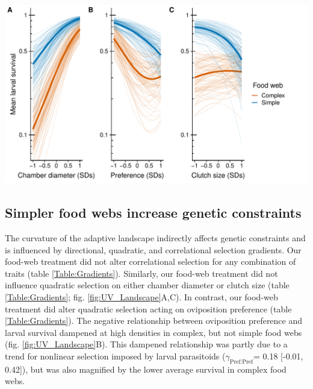 \documentclass[11pt,]{article}
\let\origfigure\figure
\let\endorigfigure\endfigure
\renewenvironment{figure}[1][2] {
    \expandafter\origfigure\expandafter[H]
} {
    \endorigfigure
}
\begin{document}
\begin{figure}
\centering
\includegraphics{analyses/UV_landscapes.pdf}
\caption{\label{fig:UV_Landscape}Adaptive landscape of gall midge
phenotypes in complex vs.~simple food webs. Each panel corresponds to a
different phenotypic trait: chamber diameter (A); oviposition preference
(B); and clutch size (C). Bold lines represent selection experienced in
complex (orange) and simple (blue) food webs. Thin lines represent
bootstrapped replicates to show the uncertainty in selection. For
clarity, we only display 100 bootstraps even though inferences are based
on 1,000 replicates. Note that mean larval survival is plotted on a
natural log scale to reflect the mathematical defintion of the adaptive
landscape.}
\end{figure}

\subsection{Simpler food webs increase genetic
constraints}\label{simpler-food-webs-increase-genetic-constraints}

\indent The curvature of the adaptive landscape indirectly affects
genetic constraints and is influenced by directional, quadratic, and
correlational selection gradients. Our food-web treatment did not alter
correlational selection for any combination of traits (table
\ref{Table:Gradients}). Similarly, our food-web treatment did not
influence quadratic selection on either chamber diameter or clutch size
(table \ref{Table:Gradients}; fig. \ref{fig:UV_Landscape}A,C). In
contrast, our food-web treatment did alter quadratic selection acting on
oviposition preference (table \ref{Table:Gradients}). The negative
relationship between oviposition preference and larval survival dampened
at high densities in complex, but not simple food webs (fig.
\ref{fig:UV_Landscape}B). This dampened relationship was partly due to a
trend for nonlinear selection imposed by larval parasitoids
(\(\gamma_{\text{Pref:Pref}}\)= 0.18 {[}-0.01, 0.42{]}), but was also
magnified by the lower average survival in complex food webs.
\end{document}
